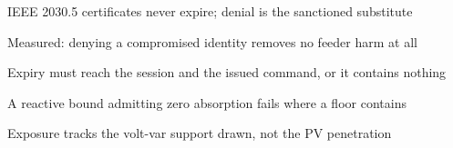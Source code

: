 \documentclass[review]{elsarticle}
\begin{document}
\begin{frontmatter}
\begin{highlights}
\item IEEE 2030.5 certificates never expire; denial is the sanctioned substitute
\item Measured: denying a compromised identity removes no feeder harm at all
\item Expiry must reach the session and the issued command, or it contains nothing
\item A reactive bound admitting zero absorption fails where a floor contains
\item Exposure tracks the volt-var support drawn, not the PV penetration
\end{highlights}
\end{frontmatter}
\end{document}
